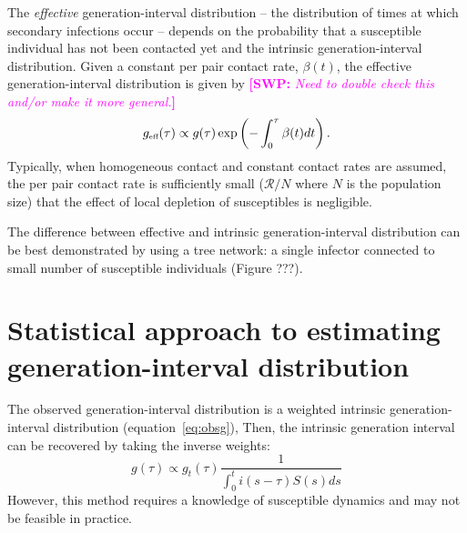 \documentclass{article}
\newcommand{\RR}{\ensuremath{{\mathcal R}}}
\newcommand{\tsub}[2]{#1_{{\textrm{\tiny #2}}}}
\newcommand{\comment}[3]{\textcolor{#1}{\textbf{[#2: }\textsl{#3}\textbf{]}}}
\newcommand{\swp}[1]{\comment{magenta}{SWP}{#1}}
\begin{document}
The \emph{effective} generation-interval distribution -- the distribution of times at which secondary infections occur -- depends on the probability that a susceptible individual has not been contacted yet and the intrinsic generation-interval distribution.
Given a constant per pair contact rate, $\beta(t)$, the effective generation-interval distribution is given by \swp{Need to double check this and/or make it more general.}
\begin{equation}
\tsub{g}{eff}(\tau) \propto g(\tau) \exp\left(-\int_0^{\tau} \beta(t) dt\right).
\end{equation}
Typically, when homogeneous contact and constant contact rates are assumed,
the per pair contact rate is sufficiently small ($\RR/N$ where $N$ is the population size) that the effect of local depletion of susceptibles is negligible.

The difference between effective and intrinsic generation-interval distribution can be best demonstrated by using a tree network: a single infector connected to small number of susceptible individuals (Figure ???).




\section{Statistical approach to estimating generation-interval distribution}

The observed generation-interval distribution is a weighted intrinsic generation-interval distribution (equation~\ref{eq:obsg}),
Then, the intrinsic generation interval can be recovered by taking the inverse weights:
\begin{equation}
g(\tau) \propto g_t(\tau) \frac{1}{\int_{0}^t i(s-\tau) S(s) ds}
\end{equation}
However, this method requires a knowledge of susceptible dynamics and may not be feasible in practice.
\end{document}
